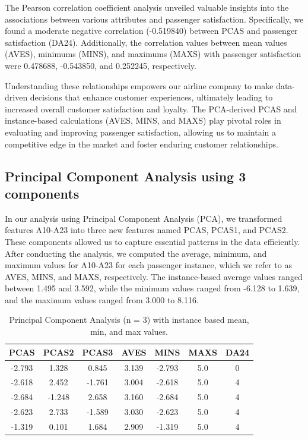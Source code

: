 \documentclass[11pt]{article}
\begin{document}
The Pearson correlation coefficient analysis unveiled valuable insights into the associations between various attributes and passenger satisfaction. Specifically, we found a moderate negative correlation (-0.519840) between PCAS and passenger satisfaction (DA24). Additionally, the correlation values between mean values (AVES), minimums (MINS), and maximums (MAXS) with passenger satisfaction were 0.478688, -0.543850, and 0.252245, respectively.

Understanding these relationships empowers our airline company to make data-driven decisions that enhance customer experiences, ultimately leading to increased overall customer satisfaction and loyalty. The PCA-derived PCAS and instance-based calculations (AVES, MINS, and MAXS) play pivotal roles in evaluating and improving passenger satisfaction, allowing us to maintain a competitive edge in the market and foster enduring customer relationships.

\subsection{Principal Component Analysis using 3 components}

In our analysis using Principal Component Analysis (PCA), we transformed features A10-A23 into three new features named PCAS, PCAS1, and PCAS2. These components allowed us to capture essential patterns in the data efficiently. After conducting the analysis, we computed the average, minimum, and maximum values for A10-A23 for each passenger instance, which we refer to as AVES, MINS, and MAXS, respectively. The instance-based average values ranged between 1.495 and 3.592, while the minimum values ranged from -6.128 to 1.639, and the maximum values ranged from 3.000 to 8.116.

\begin{table}[!h]
    \centering
    \begin{tabular}{|c|c|c|c|c|c|c|}
        \hline
        PCAS & PCAS2 & PCAS3 &  AVES &  MINS & MAXS & DA24 \\
        \hline
        -2.793 &  1.328 &  0.845 & 3.139 & -2.793  & 5.0  &   0 \\
        \hline
        -2.618 &  2.452 & -1.761 & 3.004 & -2.618  & 5.0  &   4 \\
        \hline
        -2.684 & -1.248 &  2.658 & 3.160 & -2.684  & 5.0  &   4 \\
        \hline
        -2.623 &  2.733 & -1.589 & 3.030 & -2.623  & 5.0  &   4 \\
        \hline
        -1.319 &  0.101 &  1.684 & 2.909 & -1.319  & 5.0  &   4 \\
        \hline
    \end{tabular}
    \caption{Principal Component Analysis (n = 3) with instance based mean, min, and max values.}
    \label{tab:pca2}
\end{table}
\end{document}
